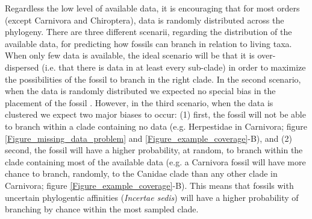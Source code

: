 \documentclass[12pt,letterpaper]{article}
\renewcommand{\subsection}[1]{%
\bigskip
\begin{center}
\begin{large}
\normalfont\itshape #1
\end{large}
\end{center}}
\begin{document}
Regardless the low level of available data, it is encouraging that for most orders (except Carnivora and Chiroptera), data is randomly distributed across the phylogeny.
There are three different scenarii, regarding the distribution of the available data, for predicting how fossils can branch in relation to living taxa.
When only few data is available, the ideal scenario will be that it is over-dispersed (i.e. that there is data in at least every sub-clade) in order to maximize the possibilities of the fossil to branch in the right clade.
In the second scenario, when the data is randomly distributed we expected no special bias in the placement of the fossil \citep{GuillermeCooper}.
However, in the third scenario, when the data is clustered we expect two major biases to occur: (1) first, the fossil will not be able to branch within a clade containing no data (e.g. Herpestidae in Carnivora; figure \ref{Figure_missing_data_problem} and \ref{Figure_example_coverage}-B), and (2) second, the fossil will have a higher probability, at random, to branch within the clade containing most of the available data (e.g. a Carnivora fossil will have more chance to branch, randomly, to the Canidae clade than any other clade in Carnivora; figure \ref{Figure_example_coverage}-B).
This means that fossils with uncertain phylogentic affinities (\textit{Incertae sedis}) will have a higher probability of branching by chance within the most sampled clade.

\end{document}
